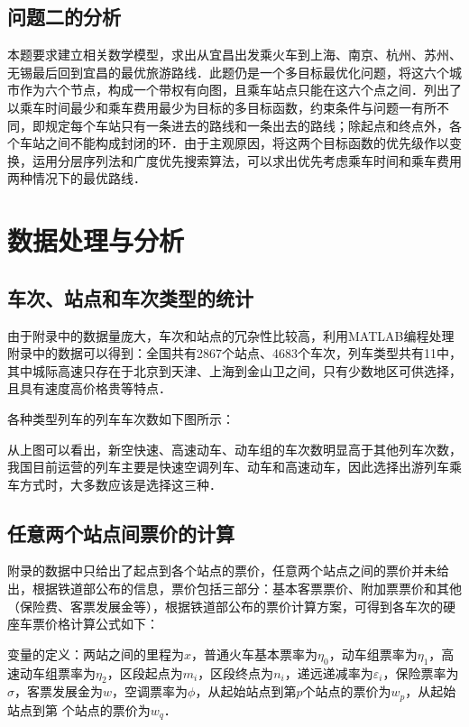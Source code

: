 \documentclass[UTF8]{ctexart}
\begin{document}
\subsection{问题二的分析}
本题要求建立相关数学模型，求出从宜昌出发乘火车到上海、南京、杭州、苏州、无锡最后回到宜昌的最优旅游路线．此题仍是一个多目标最优化问题，将这六个城市作为六个节点，构成一个带权有向图，且乘车站点只能在这六个点之间．列出了以乘车时间最少和乘车费用最少为目标的多目标函数，约束条件与问题一有所不同，即规定每个车站只有一条进去的路线和一条出去的路线；除起点和终点外，各个车站之间不能构成封闭的环．由于主观原因，将这两个目标函数的优先级作以变换，运用分层序列法和广度优先搜索算法，可以求出优先考虑乘车时间和乘车费用两种情况下的最优路线．

\section{数据处理与分析}
\subsection{车次、站点和车次类型的统计}
由于附录中的数据量庞大，车次和站点的冗杂性比较高，利用MATLAB编程处理附录中的数据可以得到：全国共有2867个站点、4683个车次，列车类型共有11中，其中城际高速只存在于北京到天津、上海到金山卫之间，只有少数地区可供选择，且具有速度高价格贵等特点．

各种类型列车的列车车次数如下图所示：

从上图可以看出，新空快速、高速动车、动车组的车次数明显高于其他列车次数，我国目前运营的列车主要是快速空调列车、动车和高速动车，因此选择出游列车乘车方式时，大多数应该是选择这三种．

\subsection{任意两个站点间票价的计算}
附录的数据中只给出了起点到各个站点的票价，任意两个站点之间的票价并未给出，根据铁道部公布的信息，票价包括三部分：基本客票票价、附加票票价和其他（保险费、客票发展金等），根据铁道部公布的票价计算方案，可得到各车次的硬座车票价格计算公式如下：

变量的定义：两站之间的里程为$x$，普通火车基本票率为$\eta_0$，动车组票率为$\eta_1$，高速动车组票率为$\eta_2$，区段起点为$m_i$，区段终点为$n_i$，递远递减率为$\varepsilon_i$，保险票率为$\sigma$，客票发展金为$w$，空调票率为$\phi$，从起始站点到第$p$个站点的票价为$w_p$，从起始站点到第 个站点的票价为$w_q$．
\end{document}
